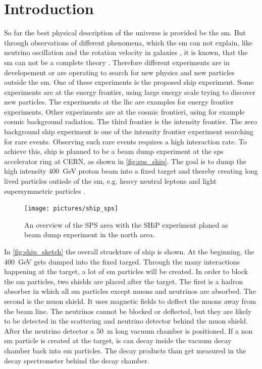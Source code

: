 \chapter{Introduction}
So far the best physical description of the universe is provided be the \ac{sm}.
But through observations of different phenomena, which the \ac{sm} can not explain, like neutrino oscillation \cite{} and the rotation velocity in galaxies \cite{}, it is known, that the \ac{sm} can not be a complete theory \cite{}.
Therefore different experiments are in developement or are operating to search for new physics and new particles outside the \ac{sm}.
One of these experiments is the proposed \ac{ship} experiment.
Some experiments are at the energy frontier, using large energy scale trying to discover new particles. The experiments at the \ac{lhc} are examples for energy frontier experiments.
Other experiments are at the cosmic frontieri, using for example cosmic background radiation.
The third frontier is the intensity frontier.
The zero background \ac{ship} experiment is one of the intensity frontier experiment searching for rare events.
Observing such rare events requires a high interaction rate.
To achieve this, \ac{ship} is planned to be a beam dump experiment at the \ac{sps} accelerator ring at CERN, as shown in \autoref{fig:sps_ship}.
The goal is to dump the high intensity \SI{400}{\giga\electronvolt} proton beam into a fixed target and thereby creating long lived particles outisde of the \ac{sm}, e.g. heavy neutral leptons and light supersymmetric particles \cite{ship}.
\begin{figure}
	\centering
	\texttt{[image: pictures/ship\_sps]}
	\caption[Plan of the SPS area in which SHiP is supposed to be build.]{An overview of the SPS area with the SHiP experiment planed as beam dump experiment in the north area. \cite{ship_facility}}
	\label{fig:sps_ship}
\end{figure}

In \autoref{fig:ship_sketch} the overall struckture of \ac{ship} is shown.
At the beginning, the \SI{400}{\giga\electronvolt} gets dumped into the fixed targed.
Through the many interactions happening at the target, a lot of \ac{sm} particles will be created.
In order to block the \ac{sm} particles, two shields are placed after the target.
The first is a hadron absorber in which all \ac{sm} particles except muons and neutrinos are absorbed.
The second is the muon shield. 
It uses magnetic fields to deflect the muons away from the beam line.
The neutrinos cannot be blocked or deflected, but they are likely to be detected in the scattering and neutrino detector behind the muon shield.
After the neutrino detector a \SI{50}{\meter} long vacuum chamber is positioned.
If a non \ac{sm} particle is created at the target, is can decay inside the vacuum decay chamber back into \ac{sm} particles.
The decay products than get measured in the decay spectrometer behind the decay chamber.

